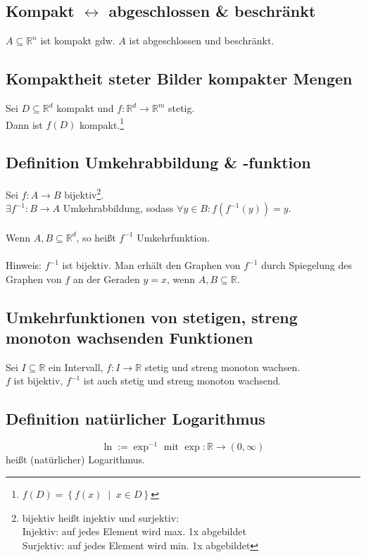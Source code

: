 \documentclass[halfparscip]{scrartcl}
\newcounter{subsection2}
\begin{document}
\subsection{Kompakt $\leftrightarrow$ abgeschlossen \& beschränkt}
$A \subseteq \mathbb{R}^n$ ist kompakt gdw. $A$ ist abgeschlossen und beschränkt.

\subsection{Kompaktheit steter Bilder kompakter Mengen}
Sei $D \subseteq \mathbb{R}^d$ kompakt und $f : \mathbb{R}^d \rightarrow \mathbb{R}^m$ stetig.\\
Dann ist $f(D)$ kompakt.\footnote{$f(D) = \left\{f(x) \;\middle|\; x \in D\right\}$}

\subsection{Definition Umkehrabbildung \& -funktion}
Sei $f: A \rightarrow B$ bijektiv\footnote{bijektiv heißt injektiv und surjektiv:\\Injektiv: auf jedes Element wird max. 1x abgebildet\\Surjektiv: auf jedes Element wird min. 1x abgebildet}.\\
$\exists f^{-1} : B \rightarrow A$ Umkehrabbildung, sodass $\forall y \in B: f(f^{-1}(y)) = y$.\\\\
Wenn $A, B \subseteq \mathbb{R}^d$, so heißt $f^{-1}$ Umkehrfunktion.\\\\
Hinweis: $f^{-1}$ ist bijektiv. Man erhält den Graphen von $f^{-1}$ durch Spiegelung des Graphen von $f$ an der Geraden $y=x$, wenn $A, B \subseteq \mathbb{R}$.

\subsection{Umkehrfunktionen von stetigen, streng monoton wachsenden Funktionen}
Sei $I \subseteq \mathbb{R}$ ein Intervall, $f : I \rightarrow \mathbb{R}$ stetig und streng monoton wachsen.\\
$f$ ist bijektiv, $f^{-1}$ ist auch stetig und streng monoton wachsend.

\subsection{Definition natürlicher Logarithmus}
\begin{equation*}
	\ln := \exp^{-1} \text{ mit } \exp: \mathbb{R} \rightarrow (0, \infty)
\end{equation*}
heißt (natürlicher) Logarithmus.
\end{document}
